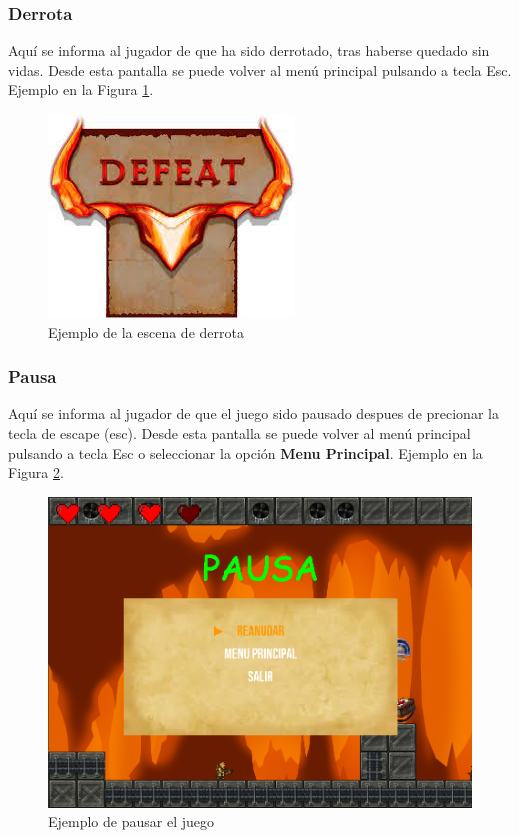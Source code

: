 \subsubsection{Derrota}
Aquí se informa al jugador de que ha sido derrotado, tras haberse quedado sin vidas. Desde esta pantalla se puede volver al menú principal pulsando a tecla Esc. Ejemplo en la Figura \ref{fig:EjemploDerrota}.

\begin{figure}[H]
	\centering
	\includegraphics[scale=0.60]{imagenes/derrota.png}
	\caption{\label{fig:EjemploDerrota}Ejemplo de la escena de derrota}
\end{figure}

\subsubsection{Pausa}
Aquí se informa al jugador de que el juego sido pausado despues de precionar la tecla de escape (esc). Desde esta pantalla se puede volver al menú principal pulsando a tecla Esc o seleccionar la opción \textbf{Menu Principal}. Ejemplo en la Figura \ref{fig:EjemploPausa}.

\begin{figure}[H]
	\centering
	\includegraphics[scale=0.50]{imagenes/Pausa.png}
	\caption{\label{fig:EjemploPausa}Ejemplo de pausar el juego}
\end{figure}

